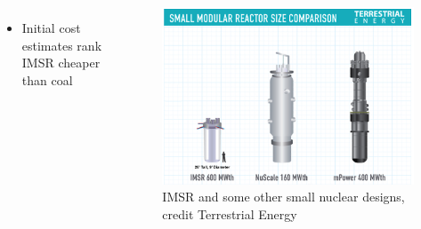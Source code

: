 \begin{frame}
\begin{columns}
\begin{itemize}
          \item{Initial cost estimates rank IMSR cheaper than coal}
      \end{itemize}
      \begin{figure}[h]
          \includegraphics[width=\textwidth]{IMSR}
          \caption{IMSR and some other small nuclear designs, credit Terrestrial Energy}
      \end{figure}
  \end{columns}

\end{frame}
